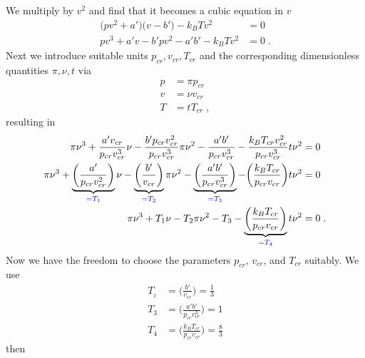 We multiply  by $v^{2}$ and find that it becomes a cubic equation in $v$
%
\begin{align*}
\bigg( p v^{2}+ a' \bigg)\bigg(v -  b' \bigg) - k_{B} T v^{2}&= 0\\
p v^{3} + a' v   -  b' p v^{2} - a' b' - k_{B} T v^{2}&= 0\;.
\end{align*}
%
Next we introduce suitable units $p_{cr},v_{cr},T_{cr}$ and the corresponding dimensionless 
quantities $\pi,\nu,t$ via
%
\begin{align*}
p &=\pi p_{cr}\\
v &=\nu v_{cr}\\
T &= t T_{cr}\;,
\end{align*}
%
resulting in 
%
\begin{align*}
\pi \nu^{3} + \frac{a' v_{cr}}{p_{cr} v_{cr}^{3} } \nu -\frac{b' p_{cr}  v_{cr}^{2}}{p_{cr} v_{cr}^{3} } \pi \nu^{2}
-\frac{a'b'}{p_{cr} v_{cr}^{3} } - \frac{k_{B}T_{cr} v_{cr}^{2}}{p_{cr} v_{cr}^{3} } t \nu^{2}&=0 \\
\pi \nu^{3} + \underbrace{
\bigg(\frac{a' }{p_{cr} v_{cr}^{2} }\bigg) 
}_{\color{blue} = T_{1}}\nu
 -\underbrace{
\bigg(\frac{b'  }{ v_{cr} }\bigg) 
}_{\color{blue} = T_{2}}\pi \nu^{2}
-\underbrace{
\bigg(\frac{a'b'}{p_{cr} v_{cr}^{3} }\bigg)
}_{\color{blue} = T_{3}} - 
\bigg(\frac{k_{B}T_{cr} }{p_{cr} v_{cr} } \bigg)
t \nu^{2}&=0 \\
\pi \nu^{3} + T_{1}\nu - T_{2} \pi \nu^{2}
-T_{3} - 
\underbrace{
\bigg(\frac{k_{B}T_{cr} }{p_{cr} v_{cr} } \bigg)
}_{\color{blue} = T_{4}} t \nu^{2}&=0 \;.
\end{align*}
%
Now we have the freedom to choose the parameters $p_{cr}$, $v_{cr}$, and $T_{cr}$ suitably.
We use
%
\begin{align}
T_{_{2}} &=\bigg(\frac{b'  }{ v_{cr} }\bigg)= \frac{1}{3}\\
T_{3}&= \bigg(\frac{a'b'}{p_{cr} v_{cr}^{3} }\bigg) =1\\
T_{4}&=\bigg(\frac{k_{B}T_{cr} }{p_{cr} v_{cr} } \bigg)= \frac{8}{3}
\end{align}
%
then
